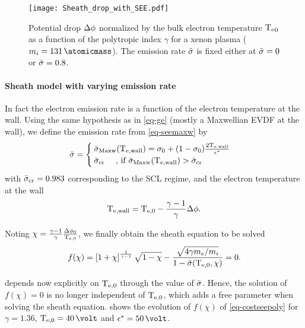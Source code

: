 \begin{figure}[!hbt]
  \centering
  \texttt{[image: Sheath\_drop\_with\_SEE.pdf]}
  \caption{Potential drop $\Delta \phi$ normalized by the bulk electron temperature $\mathrm{T_e}_0$ as a function of the polytropic index $\gamma$ for a xenon plasma ($m_i = 131\,\atomicmass$). The emission rate $ \bar{\sigma }$ is fixed either at $ \bar{\sigma }=0$ or $ \bar{\sigma }=0.8$.}
  \label{fig-dphi_see}
\end{figure}

\paragraph{Sheath model with varying emission rate\\}

In fact the electron emission rate is a function of the electron temperature at the wall.
Using the same hypothesis as in \cref{eq-ge} (mostly a Maxwellian \ac{EVDF} at the wall), we define the emission rate from \cref{eq-seemaxw} by
\begin{equation} \label{eq-seemaxw_poly}
   \bar{\sigma } = 
  \begin{cases}
     \bar{\sigma }_{\rm Maxw}(\mathrm{T_{e, wall}}) =  \sigma_0 + ( 1 - \sigma_0) \frac{ 2 \mathrm{T_{e, wall}}  }{\epsilon^{*}} \\
     \bar{\sigma }_{\rm cr} \text{ \quad, if }  \bar{\sigma }_{\rm Maxw}(\mathrm{T_{e, wall}}) >  \bar{\sigma }_{\rm cr}
  \end{cases}
\end{equation}
with $ \bar{\sigma }_{\rm cr} = 0.983$ corresponding to the \ac{SCL} regime, and the electron temperature at the wall
\begin{equation} \label{eq-Tewall}
  \mathrm{T_{e, wall}} = \mathrm{T_{e, 0}} - \frac{\gamma - 1}{\gamma } \Delta \phi.
\end{equation}


Noting $\chi = \frac{\gamma -1}{\gamma} \frac{ \Delta \phi_0}{ \mathrm{T_{e, 0}}} $, we finally obtain the sheath equation to be solved
\begin{equation} \label{eq-costseepoly}
  f(\chi) = \left[ 1 + \chi  \right]^{\frac{1}{\gamma - 1}} \sqrt{1 - \chi} - \frac{  \sqrt{4 \gamma m_e / m_i}}{1 -  \bar{\sigma } (\mathrm{T_{e, 0}}, \chi )} = 0.
\end{equation}

 depends now explicitly on $\mathrm{T_{e, 0}}$ through the value of $ \bar{\sigma }$.
Hence, the solution of $f(\chi)=0$ is no longer independent of $\mathrm{T_{e, 0}}$, which adds a free parameter when solving the sheath equation.
 shows the evolution of $f(\chi)$ of \cref{eq-costseepoly} for $\gamma = 1.36$, $\Teb=40\,\volt$ and $\crover=50\,\volt$.

